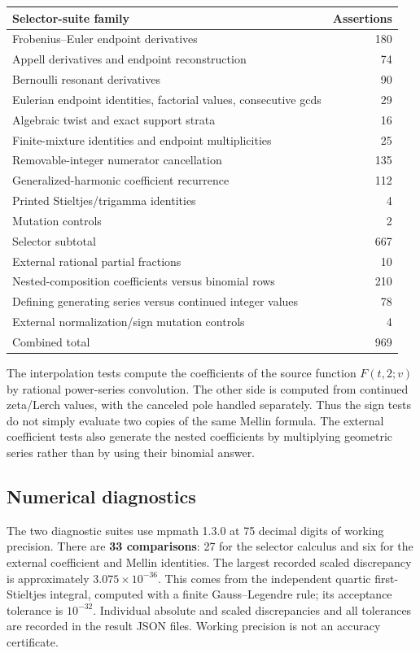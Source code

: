 \documentclass[11pt,letterpaper]{article}
\numberwithin{equation}{section}
\theoremstyle{definition}
\theoremstyle{remark}\newtheorem{remark}[theorem]{Remark}
\begin{document}
\begin{center}
\small
\begin{tabular}{@{}p{}r@{}}
\toprule
Selector-suite family & Assertions\\
\midrule
Frobenius--Euler endpoint derivatives & 180\\
Appell derivatives and endpoint reconstruction & 74\\
Bernoulli resonant derivatives & 90\\
Eulerian endpoint identities, factorial values, consecutive gcds & 29\\
Algebraic twist and exact support strata & 16\\
Finite-mixture identities and endpoint multiplicities & 25\\
Removable-integer numerator cancellation & 135\\
Generalized-harmonic coefficient recurrence & 112\\
Printed Stieltjes/trigamma identities & 4\\
Mutation controls & 2\\
\midrule
Selector subtotal & 667\\
\midrule
External rational partial fractions & 10\\
Nested-composition coefficients versus binomial rows & 210\\
Defining generating series versus continued integer values & 78\\
External normalization/sign mutation controls & 4\\
\midrule
Combined total & 969\\
\bottomrule
\end{tabular}
\end{center}

The interpolation tests compute the coefficients of the source
function $F(t,2;v)$ by rational power-series convolution. The other
side is computed from continued zeta/Lerch values, with the canceled
pole handled separately. Thus the sign tests do not simply evaluate
two copies of the same Mellin formula. The external coefficient tests
also generate the nested coefficients by multiplying geometric series
rather than by using their binomial answer.

\subsection{Numerical diagnostics}

The two diagnostic suites use mpmath 1.3.0 at 75 decimal digits of
working precision. There are \textbf{33 comparisons}: 27 for the
selector calculus and six for the external coefficient and Mellin
identities. The largest recorded scaled discrepancy is approximately
$3.075\times10^{-36}$. This comes from the independent quartic
first-Stieltjes integral, computed with a finite Gauss--Legendre rule;
its acceptance tolerance is $10^{-32}$. Individual absolute and scaled
discrepancies and all tolerances are recorded in the result JSON files.
Working precision is not an accuracy certificate.
\end{document}
